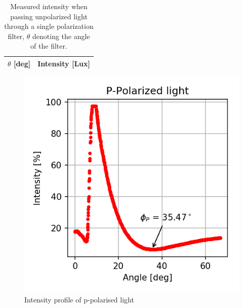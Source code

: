 \documentclass[11pt,a4paper]{article}
\begin{document}
  \begin{table}[H]
      \center
      \caption{Measured intensity when passing unpolarized light through a single polarization filter, $\theta$ denoting the angle of the filter.}
       \begin{tabular}{r | l}
        $\theta$ [deg] & Intensity [Lux] \\ \hline
         
       \end{tabular}
       \label{tab:ana_pola}
  \end{table}


  \begin{figure}[H]
    \center
    \includegraphics[scale=0.8]{scripts/ppolar.png}
    \caption{Intensity profile of p-polarised light}
  \end{figure}
\end{document}

